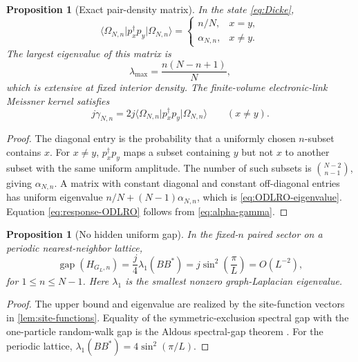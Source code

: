 \documentclass[11pt]{article}
\newtheorem{proposition}[theorem]{Proposition}
\theoremstyle{definition}
\theoremstyle{remark}
\newcommand{\ket}[1]{\lvert #1\rangle}
\newcommand{\bra}[1]{\langle #1\rvert}
\begin{document}
\begin{proposition}[Exact pair-density matrix]
\label{prop:ODLRO}
In the state \eqref{eq:Dicke},
\begin{equation}
 \bra{\Omega_{N,n}}p_x^\dagger p_y\ket{\Omega_{N,n}}
 =\begin{cases}
 n/N,&x=y,\\[0.25em]
 \alpha_{N,n},&x\ne y.
 \end{cases}
 \label{eq:pair-correlator}
\end{equation}
The largest eigenvalue of this matrix is
\begin{equation}
 \lambda_{\max}=\frac{n(N-n+1)}N,
 \label{eq:ODLRO-eigenvalue}
\end{equation}
which is extensive at fixed interior density.  The finite-volume electronic-link Meissner kernel satisfies
\begin{equation}
 j\gamma_{N,n}=2j\bra{\Omega_{N,n}}p_x^\dagger p_y\ket{\Omega_{N,n}}
 \qquad(x\ne y).
 \label{eq:response-ODLRO}
\end{equation}
\end{proposition}

\begin{proof}
The diagonal entry is the probability that a uniformly chosen $n$-subset contains $x$.  For $x\ne y$,
$p_x^\dagger p_y$ maps a subset containing $y$ but not $x$ to another subset with the same uniform
amplitude.  The number of such subsets is $\binom{N-2}{n-1}$, giving $\alpha_{N,n}$.  A matrix with
constant diagonal and constant off-diagonal entries has uniform eigenvalue
$n/N+(N-1)\alpha_{N,n}$, which is \eqref{eq:ODLRO-eigenvalue}.  Equation
\eqref{eq:response-ODLRO} follows from \eqref{eq:alpha-gamma}.
\end{proof}

\begin{proposition}[No hidden uniform gap]
\label{prop:gap-closing}
In the fixed-$n$ paired sector on a periodic nearest-neighbor lattice,
\begin{equation}
 \operatorname{gap}(H_{G_L,n})
 =\frac j4\lambda_1(BB^*)
 =j\sin^2\!\left(\frac\pi L\right)
 =O(L^{-2}),
 \label{eq:gap-closing}
\end{equation}
for $1\le n\le N-1$.  Here $\lambda_1$ is the smallest nonzero graph-Laplacian eigenvalue.
\end{proposition}

\begin{proof}
The upper bound and eigenvalue are realized by the site-function vectors in
\cref{lem:site-functions}.  Equality of the symmetric-exclusion spectral gap with the one-particle
random-walk gap is the Aldous spectral-gap theorem \cite{Caputo2010}.  For the periodic lattice,
$\lambda_1(BB^*)=4\sin^2(\pi/L)$.
\end{proof}
\end{document}
